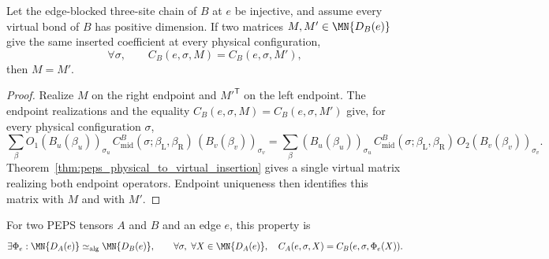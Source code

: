 \begin{theorem}%
    \label{thm:peps_edgeInsertedCoeff_injective}
    \leanok
    Let the edge-blocked three-site chain of \(B\) at \(e\) be injective, and
    assume every virtual bond of \(B\) has positive dimension.  If two matrices
    \(M,M'\in\MN{D_B(e)}\) give the same inserted coefficient at every physical
    configuration,
    \[
        \forall\sigma,\qquad
        C_B(e,\sigma,M)=C_B(e,\sigma,M'),
    \]
    then \(M=M'\).
\end{theorem}

\begin{proof}\leanok
    Realize \(M\) on the right endpoint and \(M'^{\mathsf T}\) on the left
    endpoint.  The endpoint realizations and the equality
    $C_B(e,\sigma,M)=C_B(e,\sigma,M')$ give, for every physical configuration
    $\sigma$,
    \[
        \sum_{\beta}
        O_1(B_u(\beta_u))_{\sigma_u}\,
        C_{\mathrm{mid}}^B(\sigma;\beta_{\mathrm{L}},\beta_{\mathrm{R}})\,
        (B_v(\beta_v))_{\sigma_v}
        =
        \sum_{\beta}
        (B_u(\beta_u))_{\sigma_u}\,
        C_{\mathrm{mid}}^B(\sigma;\beta_{\mathrm{L}},\beta_{\mathrm{R}})\,
        O_2(B_v(\beta_v))_{\sigma_v}.
    \]
    Theorem~\ref{thm:peps_physical_to_virtual_insertion} gives a single virtual
    matrix realizing both endpoint operators.  Endpoint uniqueness then
    identifies this matrix with \(M\) and with \(M'\).
\end{proof}

\begin{definition}%
    \label{def:peps_edgeBlockedInsertionAlgebraIsomorphism_property}
    \leanok
    For two PEPS tensors $A$ and $B$ and an edge $e$, this property is
    \[
        \exists \Phi_e:\MN{D_A(e)}
        \simeq_{\mathrm{alg}}
        \MN{D_B(e)},\qquad
        \forall \sigma,\ \forall X\in\MN{D_A(e)},\quad
        C_A(e,\sigma,X)=C_B(e,\sigma,\Phi_e(X)).
    \]
\end{definition}

